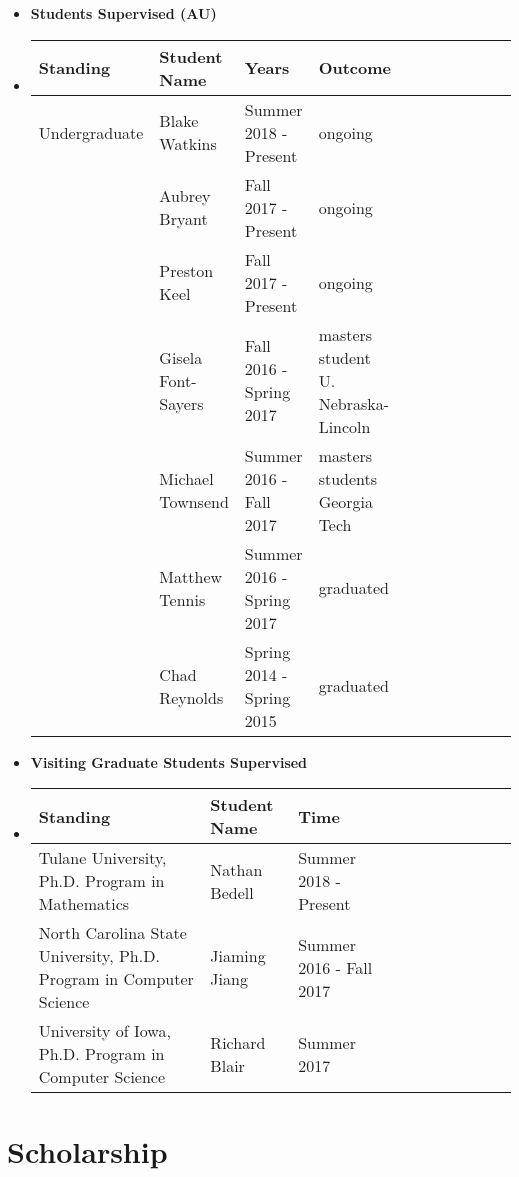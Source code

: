 \documentclass{article}
\begin{document}
\begin{itemize}
  \item[] \textbf{Students Supervised (AU)}\\
  \item[] 
    \begin{tabular}{|l|l|l|l|l|l|l|l|l|l|l|}
    \hline
    \textbf{Standing} & \textbf{Student Name} & \textbf{Years} & \textbf{Outcome}\\  
    \hline
    Undergraduate     & Blake Watkins         & Summer 2018 - Present     & ongoing\\
                      & Aubrey Bryant         & Fall 2017   - Present     & ongoing\\
                      & Preston Keel          & Fall 2017   - Present     & ongoing\\
                      & Gisela Font-Sayers    & Fall 2016   - Spring 2017 & masters student U. Nebraska-Lincoln\\
                      & Michael Townsend      & Summer 2016 - Fall 2017   & masters students Georgia Tech\\
                      & Matthew Tennis        & Summer 2016 - Spring 2017 & graduated\\
                      & Chad Reynolds         & Spring 2014 - Spring 2015 & graduated\\
    \hline
    \end{tabular}
  \item[] \textbf{Visiting Graduate Students Supervised}\\
  \item[]
    {\small
    \begin{tabular}{|l|l|l|l|l|l|l|l|l|l|l|}
    \hline
    \textbf{Standing} & \textbf{Student Name} & \textbf{Time}\\  
    \hline
    Tulane University, Ph.D. Program in Mathematics                       & Nathan Bedell       & Summer 2018 - Present\\
    North Carolina State University, Ph.D. Program in Computer Science    & Jiaming Jiang       & Summer 2016 - Fall 2017\\
    University of Iowa, Ph.D. Program in Computer Science                 & Richard Blair       & Summer 2017\\
    \hline
    \end{tabular}
    }
  \end{itemize}
  
  \section{Scholarship}
  \label{sec:scholarship}
  
\end{document}
